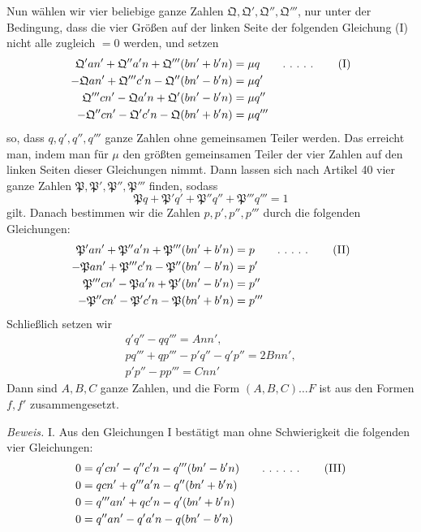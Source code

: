 Nun wählen wir vier beliebige ganze Zahlen $\mathfrak{Q},\mathfrak{Q}',\mathfrak{Q}'',\mathfrak{Q}'''$, nur unter der Bedingung, dass die vier Größen auf der linken Seite der folgenden Gleichung (I) nicht alle zugleich $=0$ werden, und setzen
\[
\begin{aligned}
\mathfrak{Q}'an'+\mathfrak{Q}''a'n+\mathfrak{Q}'''(bn'+b'n)&=\mu q\qquad\ldotp\,\ldotp\,\ldotp\,\ldotp\,\ldotp\qquad\text{(I)}\\
-\mathfrak{Q}an'+\mathfrak{Q}'''c'n-\mathfrak{Q}''(bn'-b'n)&=\mu q'\\
\mathfrak{Q}'''cn'-\mathfrak{Q}a'n+\mathfrak{Q}'(bn'-b'n)&=\mu q''\\
-\mathfrak{Q}''cn'-\mathfrak{Q}'c'n-\mathfrak{Q}(bn'+b'n)&=\mu q'''
\end{aligned}
\]
so, dass $q,q',q'',q'''$ ganze Zahlen ohne gemeinsamen Teiler werden. Das erreicht man, indem man für $\mu$ den größten gemeinsamen Teiler der vier Zahlen auf den linken Seiten dieser Gleichungen nimmt. Dann lassen sich nach Artikel 40 vier ganze Zahlen $\mathfrak{P},\mathfrak{P}',\mathfrak{P}'',\mathfrak{P}'''$ finden, sodass
\[
\mathfrak{P}q+\mathfrak{P}'q'+\mathfrak{P}''q''+\mathfrak{P}'''q'''=1
\]
gilt. Danach bestimmen wir die Zahlen $p,p',p'',p'''$ durch die folgenden Gleichungen:
\[
\begin{aligned}
\mathfrak{P}'an'+\mathfrak{P}''a'n+\mathfrak{P}'''(bn'+b'n)&=p\qquad\ldotp\,\ldotp\,\ldotp\,\ldotp\,\ldotp\qquad\text{(II)}\\
-\mathfrak{P}an'+\mathfrak{P}'''c'n-\mathfrak{P}''(bn'-b'n)&=p'\\
\mathfrak{P}'''cn'-\mathfrak{P}a'n+\mathfrak{P}'(bn'-b'n)&=p''\\
-\mathfrak{P}''cn'-\mathfrak{P}'c'n-\mathfrak{P}(bn'+b'n)&=p'''
\end{aligned}
\]
Schließlich setzen wir
\[
\begin{gathered}q'q''-qq'''=Ann',\\pq'''+qp'''-p'q''-q'p''=2Bnn',\\p'p''-pp'''=Cnn'\end{gathered}
\]
Dann sind $A,B,C$ ganze Zahlen, und die Form $(A,B,C)\ldots F$ ist aus den Formen $f,f'$ zusammengesetzt.

\textit{Beweis.} I. Aus den Gleichungen I bestätigt man ohne Schwierigkeit die folgenden vier Gleichungen:
\[
\begin{aligned}
0&=q'cn'-q''c'n-q'''(bn'-b'n)\qquad\ldotp\,\ldotp\,\ldotp\,\ldotp\,\ldotp\,\ldotp\qquad\text{(III)}\\
0&=qcn'+q'''a'n-q''(bn'+b'n)\\
0&=q'''an'+qc'n-q'(bn'+b'n)\\
0&=q''an'-q'a'n-q(bn'-b'n)
\end{aligned}
\]

